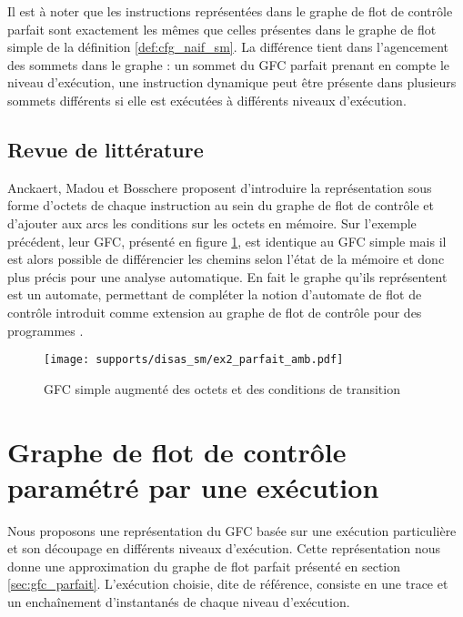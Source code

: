 Il est à noter que les instructions représentées dans le graphe de flot de contrôle parfait sont exactement les mêmes que celles présentes dans le graphe de flot simple de la définition \ref{def:cfg_naif_sm}.
La différence tient dans l'agencement des sommets dans le graphe : un sommet du GFC parfait prenant en compte le niveau d'exécution, une instruction dynamique peut être présente dans plusieurs sommets différents si elle est exécutées à différents niveaux d'exécution.

\FloatBarrier
\subsection{Revue de littérature}
Anckaert, Madou et Bosschere \cite{AMB06} proposent d'introduire la représentation sous forme d'octets de chaque instruction au sein du graphe de flot de contrôle et d'ajouter aux arcs les conditions sur les octets en mémoire. Sur l'exemple précédent, leur GFC, présenté en figure \ref{fig:sm_cfg_parfait_amb}, est identique au GFC simple mais il est alors possible de différencier les chemins selon l'état de la mémoire et donc plus précis pour une analyse automatique.
En fait le graphe qu'ils représentent est un automate, permettant de compléter la notion d'automate de flot de contrôle introduit comme extension au graphe de flot de contrôle \cite{HJMS02} pour des programmes \sms.

\begin{figure}[h]
\begin{center}
  \texttt{[image: supports/disas\_sm/ex2\_parfait\_amb.pdf]}
\end{center}
\caption{GFC simple augmenté des octets et des conditions de transition}
\label{fig:sm_cfg_parfait_amb}
\end{figure}

\section{Graphe de flot de contrôle paramétré par une exécution}
Nous proposons une représentation du GFC basée sur une exécution particulière et son découpage en différents niveaux d'exécution.
Cette représentation nous donne une approximation du graphe de flot parfait présenté en section \ref{sec:gfc_parfait}.
L'exécution choisie, dite de référence, consiste en une trace et un enchaînement d'instantanés de chaque niveau d'exécution.

